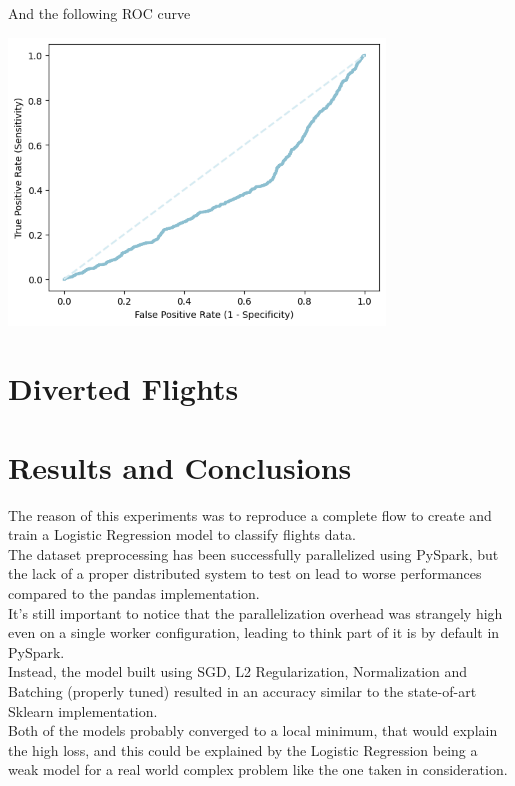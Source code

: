 \documentclass[
	letterpaper, %
	10pt, %
]{class}
\begin{document}
And the following ROC curve

\begin{center}
    \includegraphics[width=10cm]{../images/tree_roc.png}
\end{center}

\section{Diverted Flights}


\section{Results and Conclusions}

The reason of this experiments was to reproduce a complete flow to create and train a Logistic Regression model to classify flights data.\\
The dataset preprocessing has been successfully parallelized using PySpark, but the lack of a proper distributed system to test on lead to worse performances compared to the pandas implementation.\\
It's still important to notice that the parallelization overhead was strangely high even on a single worker configuration, leading to think part of it is by default in PySpark.\\

Instead, the model built using SGD, L2 Regularization, Normalization and Batching (properly tuned) resulted in an accuracy similar to the state-of-art Sklearn implementation.\\
Both of the models probably converged to a local minimum, that would explain the high loss, and this could be explained by the Logistic Regression being a weak model for a real world complex problem like the one taken in consideration.


\printbibliography %

\end{document}

